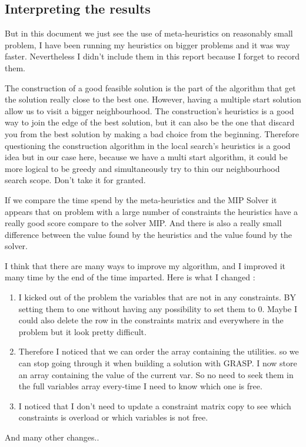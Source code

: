 \documentclass[12pt]{article}
\begin{document}
	\subsection{Interpreting the results}
	
	But in this document we just see the use of meta-heuristics on reasonably small problem, I have been running my heuristics on bigger problems and it was way faster. Nevertheless I didn't include them in this report because I forget to record them.
	
	The construction of a good feasible solution is the part of the algorithm that get the solution really close to the best one. However, having a multiple start solution allow us to visit a bigger neighbourhood. 
	The construction's heuristics is a good way to join the edge of the best solution, but it can also be the one that discard you from the best solution by making a bad choice from the beginning. Therefore questioning the construction algorithm in the local search's heuristics is a good idea but in our case here, because we have a multi start algorithm, it could be more logical to be greedy and simultaneously try to thin our neighbourhood search scope. Don't take it for granted.
	
	If we compare the time spend by the meta-heuristics and the MIP Solver it appears that on problem with a large number of constraints the heuristics have a really good score compare to the solver MIP. And there is also a really small difference between the value found by the heuristics and the value found by the solver.
	
	I think that there are many ways to improve my algorithm, and I improved it many time by the end of the time imparted.
	Here is what I changed :
	\begin{enumerate}
		\item I kicked out of the problem the variables that are not in any constraints. BY setting them to one without having any possibility to set them to 0.
		\subitem Maybe I could also delete the row in the constraints matrix and everywhere in the problem but it look pretty difficult.
		\item Therefore I noticed that we can order the array containing the utilities. so we can stop going through it when building a solution with GRASP.
		\subitem I now store an array containing the value of the current var. So no need to seek them in the full variables array every-time I need to know which one is free.
		
		\item I noticed that I don't need to update a constraint matrix copy to see which constraints is overload or which variables is not free.
	\end{enumerate}
	And many other changes..
	
\end{document}
